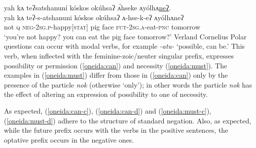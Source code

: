 \documentclass[output=paper,colorlinks,citecolor=brown]{langscibook}
\begin{document}
\ea\label{oneida:Neg PQ2}
    \glll yah kʌ teʔsatshanuní k\'oskos okúhsaʔ ʌ́hseke ʌy\'olhʌ\uline{neʔ}. \\
    yah kʌ teʔ-s-atshanuni k\'oskos okúhsaʔ ʌ-hse-k-eʔ ʌy\'olhʌneʔ \\
    not \textsc{q} \textsc{neg-2sg.p}-happy[\textsc{stat}] pig face \textsc{fut-2sg.a}-eat-\textsc{pnc} tomorrow \\
    \glt `you're not happy? you can eat the pig face tomorrow?' Verland Cornelius \citep[114 (43)]{MichelsonEtAl2016}
\z 
Polar questions can occur with modal verbs, for example \textit{-atu-} `possible, can be.' This verb, when inflected with the feminine-zoic/neuter singular prefix, expresses possibility or permission (\ref{oneida:can}) and necessity (\ref{oneida:must}). The examples in (\ref{oneida:must}) differ from those in (\ref{oneida:can}) only by the presence of the particle \textit{nok} (otherwise `only'); in other words the particle \textit{nok} has the effect of altering an expression of possibility to one of necessity. 

As expected, (\ref{oneida:can-c}), (\ref{oneida:can-d}) and (\ref{oneida:must-c}), (\ref{oneida:must-d}) adhere to the structure of standard negation. Also, as expected, while the future prefix occurs with the verbs in the positive sentences, the optative prefix occurs in the negative ones.
\end{document}

